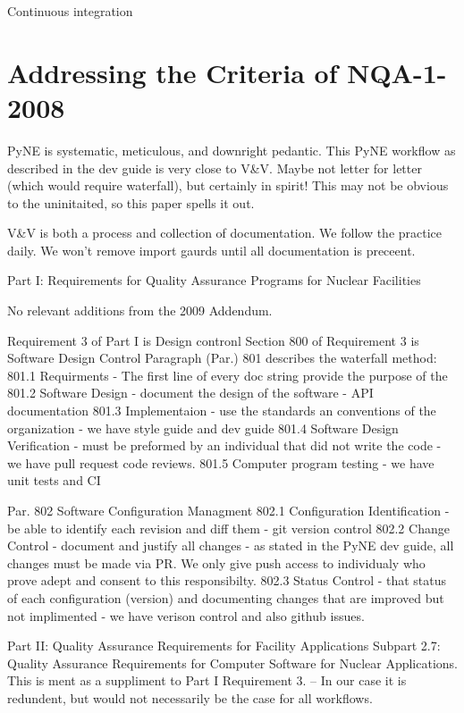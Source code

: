 \documentclass{anstrans}
\begin{document}
Continuous integration


\section{Addressing the Criteria of NQA-1-2008}

PyNE is systematic, meticulous, and downright pedantic.
This PyNE workflow as described in the dev guide is very close to V\&V. Maybe not letter for letter (which would require waterfall), but certainly in spirit! 
This may not be obvious to the uninitaited, so this paper spells it out.

V\&V is both a process and collection of documentation. We follow the practice daily. We won't remove import gaurds until all documentation is preceent.

Part I: Requirements for Quality Assurance Programs for Nuclear Facilities

No relevant additions from the 2009 Addendum.

Requirement 3 of Part I is Design contronl
Section 800 of Requirement 3 is Software Design Control 
Paragraph (Par.) 801 describes the waterfall method:
801.1 Requirments - The first line of every doc string provide the purpose of the 
801.2 Software Design - document the design of the software - API documentation
801.3 Implementaion - use the standards an conventions of the organization - we have style guide and dev guide
801.4 Software Design Verification - must be preformed by an individual that did not write the code  - we have pull request code reviews.
801.5 Computer program testing - we have unit tests and CI

Par. 802 Software Configuration Managment
802.1 Configuration Identification - be able to identify each revision and diff them - git version control
802.2 Change Control - document and justify all changes - as stated in the PyNE dev guide, all changes must be made via PR. We only give push access to individualy who prove adept and consent to this responsibilty.
802.3 Status Control - that status of each configuration (version) and documenting changes that are improved but not implimented - we have verison control and also github issues.


Part II: Quality Assurance Requirements for Facility Applications
Subpart 2.7: Quality Assurance Requirements for Computer Software for Nuclear Applications.
This is ment as a suppliment to Part I Requirement 3. -- In our case it is redundent, but would not necessarily be the case for all workflows.
\end{document}
